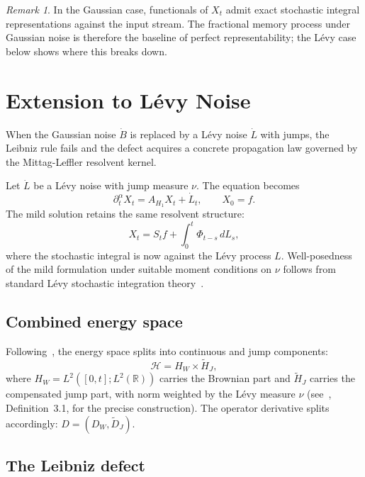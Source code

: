 \documentclass[11pt]{article}
\theoremstyle{definition}
\theoremstyle{remark}
\newtheorem{remark}[theorem]{Remark}
\newcommand{\R}{\mathbb{R}}
\newcommand{\HH}{\mathcal{H}}
\begin{document}
\begin{remark}
In the Gaussian case, functionals of $X_t$ admit exact
stochastic integral representations against the input
stream.  The fractional memory process under Gaussian
noise is therefore the baseline of perfect
representability; the L\'evy case below shows where
this breaks down.
\end{remark}

\section{Extension to L\'evy Noise}
\label{sec:levy}

When the Gaussian noise $\dot{B}$ is replaced by a
L\'evy noise $\dot{L}$ with jumps, the Leibniz rule
fails and the defect acquires a concrete propagation
law governed by the Mittag-Leffler resolvent kernel.

Let $\dot{L}$ be a L\'evy noise with jump measure
$\nu$.  The equation becomes
\begin{equation}\label{eq:levy_fmp}
\partial_t^\alpha X_t = A_{H_1} X_t + \dot{L}_t,
\qquad X_0 = f.
\end{equation}
The mild solution retains the same resolvent structure:
\begin{equation}\label{eq:mild_levy}
X_t = S_t f + \int_0^t \Phi_{t-s}\, dL_s,
\end{equation}
where the stochastic integral is now against the
L\'evy process $L$.  Well-posedness of the mild
formulation under suitable moment conditions on $\nu$
follows from standard L\'evy stochastic integration
theory~\cite{daprato2014,meerschaert2012}.

\subsection{Combined energy space}

Following~\cite{fontes2026banach}, the energy space
splits into continuous and jump components:
\begin{equation}\label{eq:combined_space}
\HH = H_W \times \widetilde{H}_J,
\end{equation}
where $H_W = L^2([0,t]; L^2(\R))$ carries the Brownian
part and $\widetilde{H}_J$ carries the compensated
jump part, with norm weighted by the L\'evy measure
$\nu$ (see~\cite{fontes2026banach}, Definition~3.1, for
the precise construction).  The operator derivative
splits accordingly: $D = (D_W, \widetilde{D}_J)$.

\subsection{The Leibniz defect}
\end{document}
